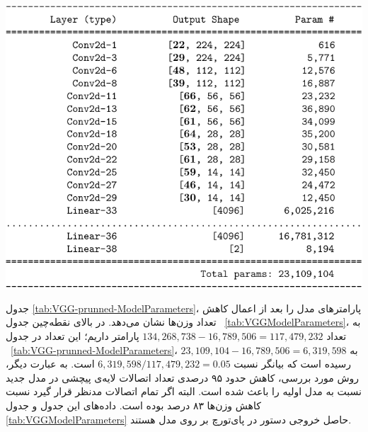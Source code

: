 \documentclass[11pt, twoside]{imsproc}
\begin{document}
\begin{table}[t]
\caption{
خلاصه مدل و پارامترهای مدل هرس شده با استفاده از بسط تیلور.
هرس وزن‌ها فقط برای لایه‌های بالای نقطه‌چین در این جدول انجام شده است.
اتصالات این لایه‌ها نسبت به لایه‌های متناظر در جدول
\ref{tab:VGGModelParameters}
نزدیک به ۹۵ درصد کاهش پیدا کرده‌اند.
اگر تعداد کل پارامترهای مدل مدنظر باشد، نسبت تعداد پارامترهای این مدل به مدل اولیه
$0.17$
است که به منزله‌ی کاهش ۸۳ درصدی می‌باشد.
به این ترتیب مدل بسیار کوچکتری حاصل شده است که کارایی کمتری از مدل اولیه ندارد.
}
\label{tab:VGG-prunned-ModelParameters}
\includegraphics[width=.7\linewidth]{images/VGG16-prunned-ModelParameters}
\end{table}

جدول
\ref{tab:VGG-prunned-ModelParameters}، 
پارامترهای مدل
را بعد از اعمال کاهش تعداد وزن‌ها نشان می‌دهد.
در بالای نقطه‌چین جدول
~\ref{tab:VGGModelParameters}، 
به تعداد
$134,268,738-16,789,506 = 117,479,232$
پارامتر  داریم؛ این تعداد در جدول
~\ref{tab:VGG-prunned-ModelParameters}، 
به
$23,109,104-16,789,506 = 6,319,598$
رسیده است که بیانگر
نسبت
$6,319,598/117,479,232 = 0.05$
است. به عبارت دیگر، 
روش مورد بررسی، کاهش حدود ۹۵ درصدی تعداد اتصالات لایه‌ی پیچشی در مدل جدید نسبت به مدل اولیه را باعث شده است. البته اگر تمام اتصالات مدنظر قرار گیرد نسبت کاهش وزن‌ها ۸۳ درصد بوده است.
داده‌های این جدول و جدول
\ref{tab:VGGModelParameters}
 حاصل خروجی دستور
در پای‌تورچ
بر روی مدل هستند.
\end{document}

